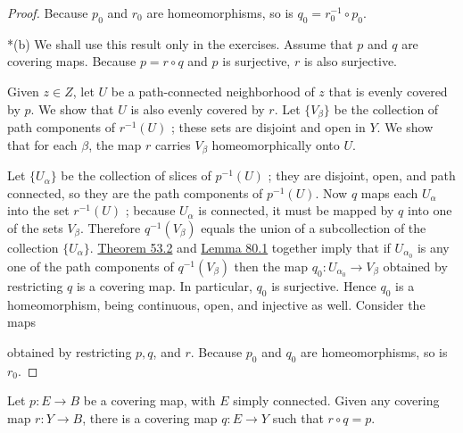 \begin{proof}
Because \(p_{0}\) and \(r_{0}\) are homeomorphisms, so is \(q_{0} = r_0^{-1} \circ {p}_{0}\).

*(b) We shall use this result only in the exercises. Assume that \(p\) and \(q\) are covering maps. Because \(p = r \circ q\) and \(p\) is surjective, \(r\) is also surjective.

Given \(z \in Z\), let \(U\) be a path-connected neighborhood of \(z\) that is evenly covered by \(p\). We show that \(U\) is also evenly covered by \(r\). Let \(\{ V_{\beta }\}\) be the collection of path components of \(r^{-1}( U)\) ; these sets are disjoint and open in \(Y\). We show that for each \(\beta\), the map \(r\) carries \(V_{\beta }\) homeomorphically onto \(U\).

Let \(\{ U_{\alpha }\}\) be the collection of slices of \(p^{-1}( U)\) ; they are disjoint, open, and path connected, so they are the path components of \(p^{-1}( U)\). Now \(q\) maps each \(U_{\alpha }\) into the set \(r^{-1}( U)\) ; because \(U_{\alpha }\) is connected, it must be mapped by \(q\) into one of the sets \(V_{\beta }\). Therefore \(q^{-1}( V_{\beta })\) equals the union of a subcollection of the collection \(\{ U_{\alpha }\}\). \hyperref[thm:53.2]{Theorem 53.2} and \hyperref[lem:80.1]{Lemma 80.1} together imply that if \(U_{{\alpha }_{0}}\) is any one of the path components of \(q^{-1}( V_{\beta })\) then the map \(q_{0} : U_{{\alpha }_{0}} \rightarrow {V}_{\beta }\) obtained by restricting \(q\) is a covering map. In particular, \(q_{0}\) is surjective. Hence \(q_{0}\) is a homeomorphism, being continuous, open, and injective as well. Consider the maps

\par\nopagebreak
\begin{center}
	\label{fig:com_80_3}
\end{center}
\par\nopagebreak 

obtained by restricting \(p,q\), and \(r\). Because \(p_{0}\) and \(q_{0}\) are homeomorphisms, so is \(r_{0}\).
\end{proof}
\begin{theorem}
\label{thm:\thetheorem}
	Let \(p : E \rightarrow B\) be a covering map, with \(E\) simply connected. Given any covering map \(r : Y \rightarrow B\), there is a covering map \(q : E \rightarrow Y\) such that \(r \circ q = p\).
\end{theorem}

